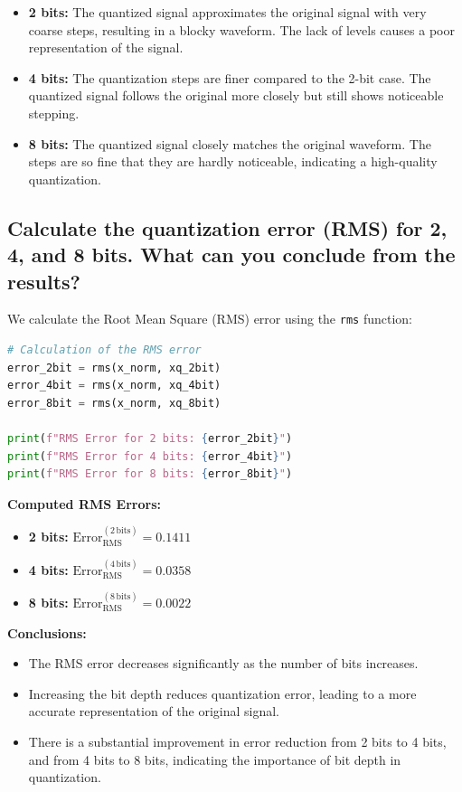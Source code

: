 \documentclass[10pt]{article}
\theoremstyle{definition}
\theoremstyle{remark}
\theoremstyle{definition}
\numberwithin{equation}{prob}
\begin{document}
\begin{itemize}
    \item \textbf{2 bits:} The quantized signal approximates the original signal with very coarse steps, resulting in a blocky waveform. The lack of levels causes a poor representation of the signal.
    \item \textbf{4 bits:} The quantization steps are finer compared to the 2-bit case. The quantized signal follows the original more closely but still shows noticeable stepping.
    \item \textbf{8 bits:} The quantized signal closely matches the original waveform. The steps are so fine that they are hardly noticeable, indicating a high-quality quantization.
\end{itemize}

\subsection{Calculate the quantization error (RMS) for 2, 4, and 8 bits. What can you conclude from the results?}

We calculate the Root Mean Square (RMS) error using the \texttt{rms} function:

\begin{lstlisting}[language=Python]
# Calculation of the RMS error
error_2bit = rms(x_norm, xq_2bit)
error_4bit = rms(x_norm, xq_4bit)
error_8bit = rms(x_norm, xq_8bit)

print(f"RMS Error for 2 bits: {error_2bit}")
print(f"RMS Error for 4 bits: {error_4bit}")
print(f"RMS Error for 8 bits: {error_8bit}")
\end{lstlisting}

\textbf{Computed RMS Errors:}

\begin{itemize}
    \item \textbf{2 bits:} \( \text{Error}_{\text{RMS}}^{(2\,\text{bits})} = 0.1411 \)
    \item \textbf{4 bits:} \( \text{Error}_{\text{RMS}}^{(4\,\text{bits})} = 0.0358 \)
    \item \textbf{8 bits:} \( \text{Error}_{\text{RMS}}^{(8\,\text{bits})} = 0.0022 \)
\end{itemize}


\textbf{Conclusions:}

\begin{itemize}
    \item The RMS error decreases significantly as the number of bits increases.
    \item Increasing the bit depth reduces quantization error, leading to a more accurate representation of the original signal.
    \item There is a substantial improvement in error reduction from 2 bits to 4 bits, and from 4 bits to 8 bits, indicating the importance of bit depth in quantization.
\end{itemize}
\end{document}
